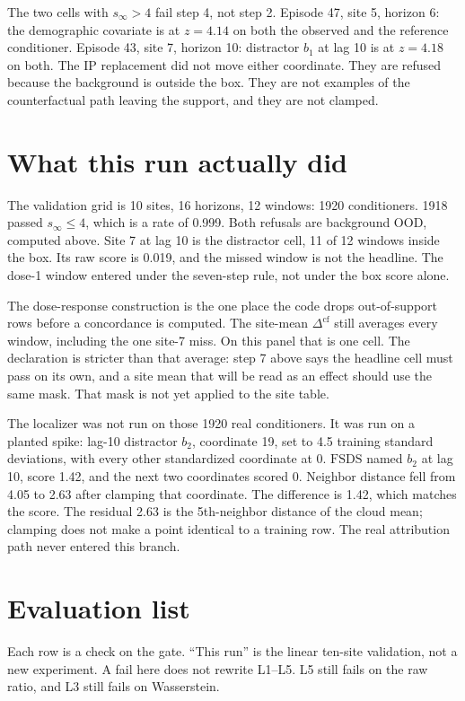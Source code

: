 \documentclass[11pt]{article}
\begin{document}
The two cells with $s_{\infty}>4$ fail step 4, not step 2.
Episode 47, site 5, horizon 6: the demographic covariate is at $z=4.14$ on both the observed and the reference conditioner.
Episode 43, site 7, horizon 10: distractor $b_{1}$ at lag 10 is at $z=4.18$ on both.
The IP replacement did not move either coordinate.
They are refused because the background is outside the box.
They are not examples of the counterfactual path leaving the support, and they are not clamped.

\section{What this run actually did}

The validation grid is 10 sites, 16 horizons, 12 windows: 1920 conditioners.
1918 passed $s_{\infty}\le 4$, which is a rate of 0.999.
Both refusals are background OOD, computed above.
Site 7 at lag 10 is the distractor cell, 11 of 12 windows inside the box.
Its raw score is 0.019, and the missed window is not the headline.
The dose-1 window entered under the seven-step rule, not under the box score alone.

The dose-response construction is the one place the code drops out-of-support rows before a concordance is computed.
The site-mean $\Delta^{\mathrm{cf}}$ still averages every window, including the one site-7 miss.
On this panel that is one cell.
The declaration is stricter than that average: step 7 above says the headline cell must pass on its own, and a site mean that will be read as an effect should use the same mask.
That mask is not yet applied to the site table.

The localizer was not run on those 1920 real conditioners.
It was run on a planted spike: lag-10 distractor $b_{2}$, coordinate 19, set to 4.5 training standard deviations, with every other standardized coordinate at 0.
$\mathrm{FSDS}$ named $b_{2}$ at lag 10, score 1.42, and the next two coordinates scored 0.
Neighbor distance fell from 4.05 to 2.63 after clamping that coordinate.
The difference is 1.42, which matches the score.
The residual 2.63 is the 5th-neighbor distance of the cloud mean; clamping does not make a point identical to a training row.
The real attribution path never entered this branch.

\section{Evaluation list}

Each row is a check on the gate.
``This run'' is the linear ten-site validation, not a new experiment.
A fail here does not rewrite L1--L5.
L5 still fails on the raw ratio, and L3 still fails on Wasserstein.
\end{document}
